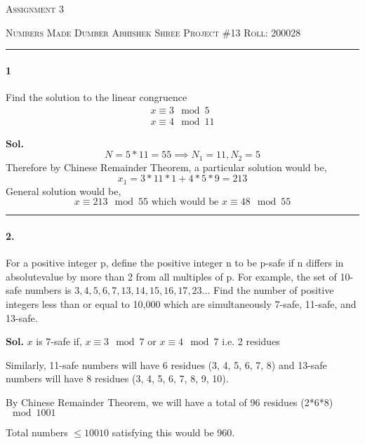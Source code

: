 \documentclass[12pt,oneside,reqno]{amsart}
\begin{document}
\thispagestyle{empty}
\begin{center}
    
    {\scshape \large  Assignment 3}
\end{center}
{\scshape Numbers Made Dumber} \hfill 
\hfill {\scshape Abhishek Shree}
\linebreak
{\scshape Project \#13}  \hfill {\scshape Roll: 200028}


\smallskip

\hrule

\bigskip
\paragraph*{1} Find the solution to the linear congruence 
\begin{gather*}
    x \equiv 3 \mod 5 \\
    x \equiv 4 \mod 11
\end{gather*}

\textbf{Sol.}
 $$N = 5*11 = 55
 \implies N_1 = 11, N_2 = 5$$
Therefore by Chinese Remainder Theorem, a particular solution would be,
$$ x_1 = 3*11*1 + 4*5*9 = 213$$
General solution would be,
$$x \equiv 213 \mod 55 \text{ which would be } \boxed{x \equiv 48 \mod 55}$$


\par\noindent\textcolor{gray}{\rule{\textwidth}{0.5pt}}
\smallskip

\paragraph*{2.} For a positive integer p, define the positive integer n to be p-safe if n differs in absolutevalue by more than 2 from all multiples of p.  For example, the set of 10-safe numbers is $3, 4, 5, 6, 7, 13, 14, 15, 16, 17, 23...$ Find the number of positive integers less than or equal to 10,000 which are simultaneously 7-safe, 11-safe, and 13-safe.

\bigskip
\textbf{Sol.}
$x$ is 7-safe if, $x\equiv 3 \mod 7$ or $x\equiv 4 \mod 7$ i.e. 2 residues

Similarly, 11-safe numbers will have 6 residues (3, 4, 5, 6, 7, 8) and 13-safe numbers will have 8 residues (3, 4, 5, 6, 7, 8, 9, 10).

By Chinese Remainder Theorem, we will have a total of 96 residues (2*6*8) $\mod 1001$

Total numbers $\le10010$ satisfying this would be 960.
\end{document}
